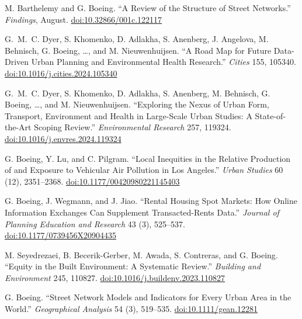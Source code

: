 \documentclass[11pt,a4paper]{report} %
\begin{document}
\begin{tablist}
\item[2024] \tab{}M. Barthelemy and G. Boeing. \enquote{A Review of the Structure of Street Networks.} \textit{Findings}, August. \href{https://doi.org/10.32866/001c.122117}{doi:10.32866/001c.122117}

\item[2024] \tab{}G.~M.~C. Dyer, S. Khomenko, D. Adlakha, S. Anenberg, J. Angelova, M. Behnisch, G. Boeing, \ldots, and M. Nieuwenhuijsen. \enquote{A Road Map for Future Data-Driven Urban Planning and Environmental Health Research.} \textit{Cities} 155, 105340. \href{https://doi.org/10.1016/j.cities.2024.105340}{doi:10.1016/j.cities.2024.105340}

\item[2024] \tab{}G.~M.~C. Dyer, S. Khomenko, D. Adlakha, S. Anenberg, M. Behnisch, G. Boeing, \ldots, and M. Nieuwenhuijsen. \enquote{Exploring the Nexus of Urban Form, Transport, Environment and Health in Large-Scale Urban Studies: A State-of-the-Art Scoping Review.} \textit{Environmental Research} 257, 119324. \href{https://doi.org/10.1016/j.envres.2024.119324}{doi:10.1016/j.envres.2024.119324}

\item[2023] \tab{}G. Boeing, Y. Lu, and C. Pilgram. \enquote{Local Inequities in the Relative Production of and Exposure to Vehicular Air Pollution in Los Angeles.} \textit{Urban Studies} 60 (12), 2351--2368. \href{https://doi.org/10.1177/00420980221145403}{doi:10.1177/00420980221145403}

\item[2023] \tab{}G. Boeing, J. Wegmann, and J. Jiao. \enquote{Rental Housing Spot Markets: How Online Information Exchanges Can Supplement Transacted-Rents Data.} \textit{Journal of Planning Education and Research} 43 (3), 525--537. \href{https://doi.org/10.1177/0739456X20904435}{doi:10.1177/0739456X20904435}

\item[2023] \tab{}M. Seyedrezaei, B. Becerik-Gerber, M. Awada, S. Contreras, and G. Boeing. \enquote{Equity in the Built Environment: A Systematic Review.} \textit{Building and Environment} 245, 110827. \href{https://doi.org/10.1016/j.buildenv.2023.110827}{doi:10.1016/j.buildenv.2023.110827}

\item[2022] \tab{}G. Boeing. \enquote{Street Network Models and Indicators for Every Urban Area in the World.} \textit{Geographical Analysis} 54 (3), 519--535. \href{https://doi.org/10.1111/gean.12281}{doi:10.1111/gean.12281}


\end{tablist}
\end{document}
